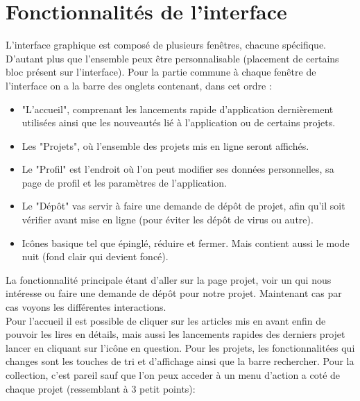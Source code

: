 \documentclass{report}
\begin{document}
\section{Fonctionnalités de l'interface}
L'interface graphique est composé de plusieurs fenêtres, chacune spécifique. D'autant plus que l'ensemble peux être personnalisable (placement de certains bloc présent sur l'interface). Pour la partie commune à chaque fenêtre de l'interface
on a la barre des onglets contenant, dans cet ordre :
\vspace{0.5cm}
\begin{itemize}
    \item "L'accueil", comprenant les lancements rapide d'application dernièrement utilisées ainsi que les nouveautés lié à l'application ou de certains projets.
    \item Les "Projets", où l'ensemble des projets mis en ligne seront affichés. 
    \item Le "Profil" est l'endroit où l'on peut modifier ses données personnelles, sa page de profil et les paramètres de l'application.
    \item Le "Dépôt" vas servir à faire une demande de dépôt de projet, afin qu'il soit vérifier avant mise en ligne (pour éviter les dépôt de virus ou autre).
    \item Icônes basique tel que épinglé, réduire et fermer. Mais contient aussi le mode nuit (fond clair qui devient foncé).
\end{itemize}
\vspace{0.5cm}
La fonctionnalité principale étant d'aller sur la page projet, voir un qui nous intéresse ou faire une demande de dépôt pour notre projet. Maintenant cas par cas voyons les différentes interactions.\\
Pour l'accueil il est possible de cliquer sur les articles mis en avant enfin de pouvoir les lires en détails, mais aussi les lancements rapides des derniers projet lancer en cliquant sur l'icône en question. Pour les projets, les fonctionnalitées qui changes sont les touches de tri et d'affichage ainsi que la barre rechercher. Pour la collection, c'est pareil sauf que l'on peux acceder à un menu d'action a coté de chaque projet (ressemblant à 3 petit points):
\end{document}
